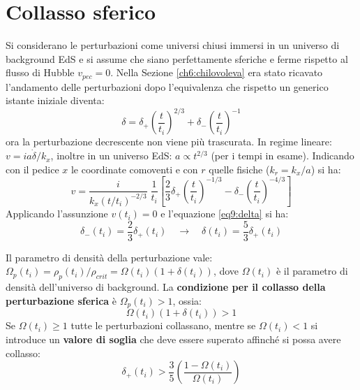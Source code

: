 \section{Collasso sferico}
Si considerano le perturbazioni come universi chiusi immersi in un universo di background EdS e si assume che siano perfettamente sferiche e ferme rispetto al flusso di Hubble $v_{pec}=0$. Nella Sezione \ref{ch6:chilovoleva} era stato ricavato l'andamento delle perturbazioni dopo l'equivalenza che rispetto un generico istante iniziale diventa:
\begin{equation}
    \delta = \delta_+ \left(\frac{t}{t_i}\right)^{2/3} + \delta_- \left(\frac{t}{t_i}\right)^{-1}\label{eq9:delta}
\end{equation}
ora la perturbazione decrescente non viene più trascurata. In regime lineare: $v = ia\dot{\delta}/k_x $, inoltre in un universo EdS: $a\propto t^{2/3}$ (per i tempi in esame). Indicando con il pedice $x$ le coordinate comoventi e con $r$ quelle fisiche ($k_r = k_x /a$) si ha: 
\begin{equation}
    v= \frac{i}{k_x \left(t/t_i\right)^{-2/3}}\;\frac{1}{t_i}\left[ \frac{2}{3}\delta_+ \left(\frac{t}{t_i}\right)^{-1/3} - \delta_- \left(\frac{t}{t_i}\right)^{-4/3}    \right]  
\end{equation}
Applicando l'assunzione $v(t_i)=0$ e l'equazione \ref{eq9:delta} si ha:
$$
\delta_- (t_i)= \frac{2}{3}\delta_+(t_i)\quad \rightarrow \quad \delta (t_i) = \frac{5}{3}\delta_+ (t_i)
$$

Il parametro di densità della perturbazione vale: $\Omega_p(t_i)=\rho_p(t_i) / \rho_{crit} = \Omega (t_i) (1+\delta(t_i))$, dove $\Omega (t_i)$ è il parametro di densità dell'universo di background. La \textbf{condizione per il collasso della perturbazione sferica} è $\Omega_p (t_i)>1$, ossia:
$$
\Omega (t_i) (1+\delta(t_i)) > 1
$$
Se $\Omega (t_i)\geq 1$ tutte le perturbazioni collassano, mentre se $\Omega (t_i)< 1$ si introduce un \textbf{valore di soglia} che deve essere superato affinché si possa avere collasso:
\begin{equation}
    \delta_+ (t_i) > \frac{3}{5}\left(\frac{1-\Omega (t_i)}{\Omega (t_i)}\right)
\end{equation}

